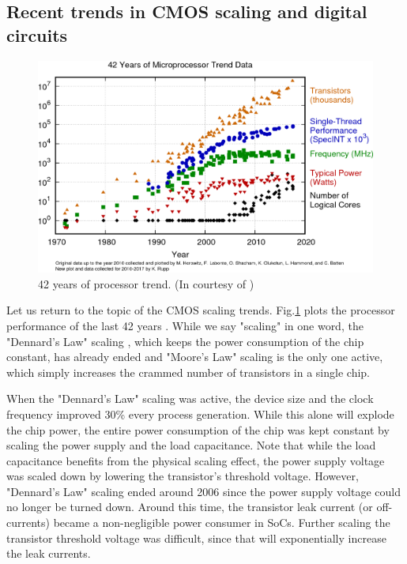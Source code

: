 \subsection{Recent trends in CMOS scaling and digital circuits}
\begin{figure}[!]
\centering
  \includegraphics[width=1\textwidth]{figure/chap1/42-years-processor-trend.png}
  \caption{42 years of processor trend. (In courtesy of \cite{processor} \cite{danowitz2012cpu})}
  \label{cpu-trends}
\end{figure}

Let us return to the topic of the CMOS scaling trends.
Fig.\ref{cpu-trends} plots the processor performance of the last 42 years \cite{processor} \cite{danowitz2012cpu}.
While we say "scaling" in one word, the "Dennard's Law" scaling \cite{dennard1974design}, which keeps the power consumption of the chip constant, has already ended and "Moore's Law" scaling \cite{moore1965cramming} is the only one active, which simply increases the crammed number of transistors in a single chip.

When the "Dennard's Law" scaling was active, the device size and the clock frequency improved 30\% every process generation.
While this alone will explode the chip power, the entire power consumption of the chip was kept constant by scaling the power supply and the load capacitance.
Note that while the load capacitance benefits from the physical scaling effect, the power supply voltage was scaled down by lowering the transistor's threshold voltage.
However, "Dennard's Law" scaling ended around 2006 since the power supply voltage could no longer be turned down. Around this time, the transistor leak current (or off-currents) became a non-negligible power consumer in SoCs. Further scaling the transistor threshold voltage was difficult, since that will exponentially increase the leak currents.


